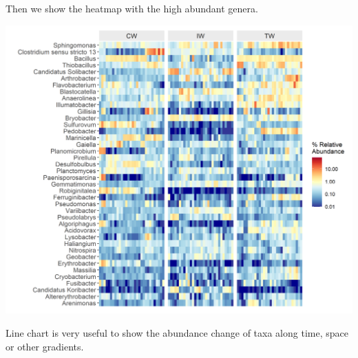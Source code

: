 \documentclass[
]{book}
\newenvironment{Shaded}{\begin{snugshade}}{\end{snugshade}}
\newcommand{\AttributeTok}[1]{\textcolor[rgb]{0.77,0.63,0.00}{#1}}
\newcommand{\CommentTok}[1]{\textcolor[rgb]{0.56,0.35,0.01}{\textit{#1}}}
\newcommand{\ConstantTok}[1]{\textcolor[rgb]{0.00,0.00,0.00}{#1}}
\newcommand{\DecValTok}[1]{\textcolor[rgb]{0.00,0.00,0.81}{#1}}
\newcommand{\FunctionTok}[1]{\textcolor[rgb]{0.00,0.00,0.00}{#1}}
\newcommand{\NormalTok}[1]{#1}
\newcommand{\OtherTok}[1]{\textcolor[rgb]{0.56,0.35,0.01}{#1}}
\newcommand{\SpecialCharTok}[1]{\textcolor[rgb]{0.00,0.00,0.00}{#1}}
\newcommand{\StringTok}[1]{\textcolor[rgb]{0.31,0.60,0.02}{#1}}
\begin{document}
Then we show the heatmap with the high abundant genera.

\begin{Shaded}
\end{Shaded}

\begin{center}\includegraphics[width=750px]{Images/plot_heatmap} \end{center}

Line chart is very useful to show the abundance change of taxa along time, space or other gradients.
\end{document}
